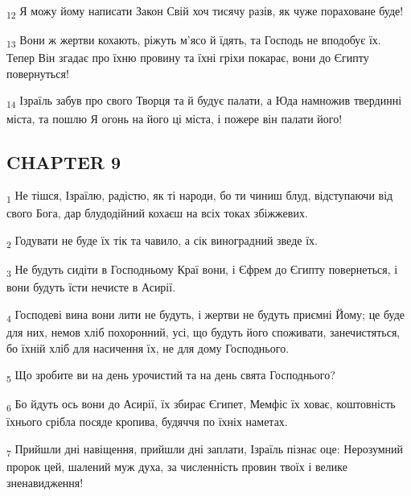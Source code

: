 \begin{tcolorbox}
\textsubscript{12} Я можу йому написати Закон Свій хоч тисячу разів, як чуже пораховане буде!
\end{tcolorbox}
\begin{tcolorbox}
\textsubscript{13} Вони ж жертви кохають, ріжуть м'ясо й їдять, та Господь не вподобує їх. Тепер Він згадає про їхню провину та їхні гріхи покарає, вони до Єгипту повернуться!
\end{tcolorbox}
\begin{tcolorbox}
\textsubscript{14} Ізраїль забув про свого Творця та й будує палати, а Юда намножив твердинні міста, та пошлю Я огонь на його ці міста, і пожере він палати його!
\end{tcolorbox}
\subsection{CHAPTER 9}
\begin{tcolorbox}
\textsubscript{1} Не тішся, Ізраїлю, радістю, як ті народи, бо ти чиниш блуд, відступаючи від свого Бога, дар блудодійний кохаєш на всіх токах збіжжевих.
\end{tcolorbox}
\begin{tcolorbox}
\textsubscript{2} Годувати не буде їх тік та чавило, а сік виноградний зведе їх.
\end{tcolorbox}
\begin{tcolorbox}
\textsubscript{3} Не будуть сидіти в Господньому Краї вони, і Єфрем до Єгипту повернеться, і вони будуть їсти нечисте в Асирії.
\end{tcolorbox}
\begin{tcolorbox}
\textsubscript{4} Господеві вина вони лити не будуть, і жертви не будуть приємні Йому; це буде для них, немов хліб похоронний, усі, що будуть його споживати, занечистяться, бо їхній хліб для насичення їх, не для дому Господнього.
\end{tcolorbox}
\begin{tcolorbox}
\textsubscript{5} Що зробите ви на день урочистий та на день свята Господнього?
\end{tcolorbox}
\begin{tcolorbox}
\textsubscript{6} Бо йдуть ось вони до Асирії, їх збирає Єгипет, Мемфіс їх ховає, коштовність їхнього срібла посяде кропива, будяччя по їхніх наметах.
\end{tcolorbox}
\begin{tcolorbox}
\textsubscript{7} Прийшли дні навіщення, прийшли дні заплати, Ізраїль пізнає оце: Нерозумний пророк цей, шалений муж духа, за численність провин твоїх і велике зненавидження!
\end{tcolorbox}
